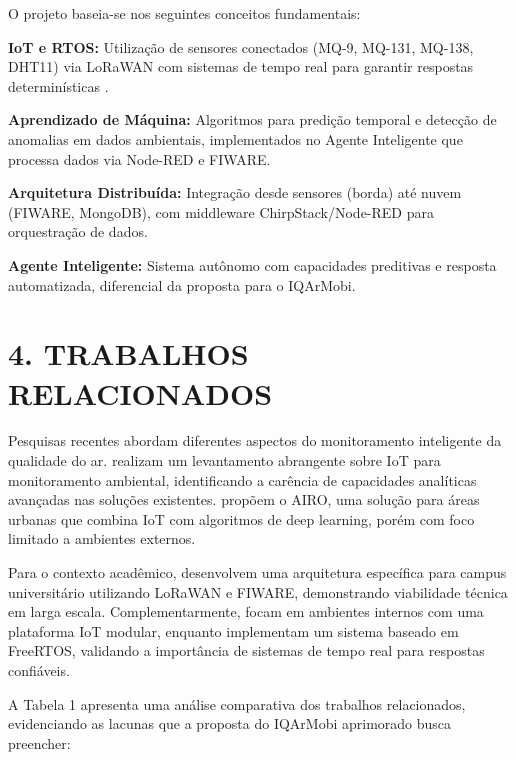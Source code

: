 \documentclass[12pt, a4paper]{article}
\begin{document}
O projeto baseia-se nos seguintes conceitos fundamentais:

\textbf{IoT e RTOS:} Utilização de sensores conectados (MQ-9, MQ-131,
MQ-138, DHT11) via LoRaWAN com sistemas de tempo real para garantir
respostas determinísticas \cite{reddy2023}.

\textbf{Aprendizado de Máquina:} Algoritmos para predição temporal e
detecção de anomalias em dados ambientais, implementados no Agente
Inteligente que processa dados via Node-RED e FIWARE.

\textbf{Arquitetura Distribuída:} Integração desde sensores (borda) até
nuvem (FIWARE, MongoDB), com middleware ChirpStack/Node-RED para
orquestração de dados.

\textbf{Agente Inteligente:} Sistema autônomo com capacidades preditivas
e resposta automatizada, diferencial da proposta para o IQArMobi.

\section*{4. TRABALHOS RELACIONADOS}

Pesquisas recentes abordam diferentes aspectos do monitoramento inteligente da qualidade do ar.  realizam um levantamento abrangente sobre IoT para monitoramento ambiental, identificando a carência de capacidades analíticas avançadas nas soluções existentes.  propõem o AIRO, uma solução para áreas urbanas que combina IoT com algoritmos de deep learning, porém com foco limitado a ambientes externos.

Para o contexto acadêmico,  desenvolvem uma arquitetura específica para campus universitário utilizando LoRaWAN e FIWARE, demonstrando viabilidade técnica em larga escala. Complementarmente,  focam em ambientes internos com uma plataforma IoT modular, enquanto  implementam um sistema baseado em FreeRTOS, validando a importância de sistemas de tempo real para respostas confiáveis.

A Tabela 1 apresenta uma análise comparativa dos trabalhos relacionados, evidenciando as lacunas que a proposta do IQArMobi aprimorado busca preencher:
\end{document}
